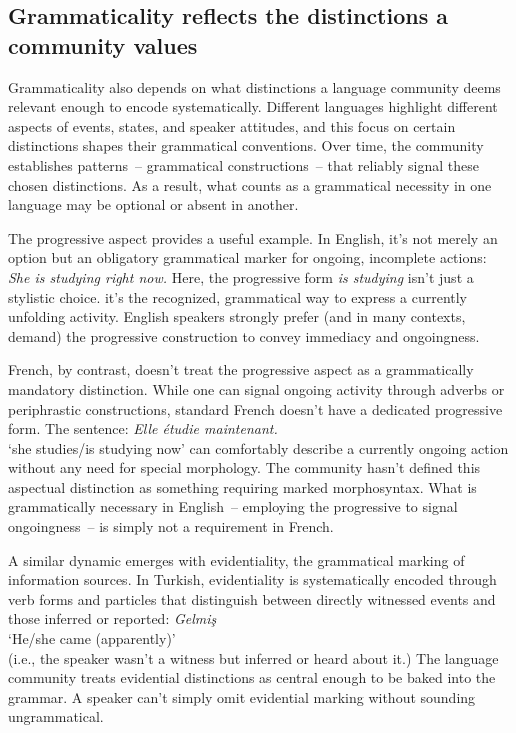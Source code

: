 \subsection{Grammaticality reflects the distinctions a community values}\label{sec:community-values}

Grammaticality also depends on what distinctions a language community deems relevant enough to encode systematically. Different languages highlight different aspects of events, states, and speaker attitudes, and this focus on certain distinctions shapes their grammatical conventions. Over time, the community establishes patterns~-- grammatical constructions~-- that reliably signal these chosen distinctions. As a result, what counts as a grammatical necessity in one language may be optional or absent in another.

The progressive aspect provides a useful example. In English, it's not merely an option but an obligatory grammatical marker for ongoing, incomplete actions:
\ea
\textit{She is studying right now.}
\z
Here, the progressive form \textit{is studying} isn't just a stylistic choice. it's the recognized, grammatical way to express a currently unfolding activity. English speakers strongly prefer (and in many contexts, demand) the progressive construction to convey immediacy and ongoingness.

French, by contrast, doesn't treat the progressive aspect as a grammatically mandatory distinction. While one can signal ongoing activity through adverbs or periphrastic constructions, standard French doesn't have a dedicated progressive form. The sentence:
\ea
\textit{Elle étudie maintenant.}\\
`she studies/is studying now'
\z
can comfortably describe a currently ongoing action without any need for special morphology. The community hasn't defined this aspectual distinction as something requiring marked morphosyntax. What is grammatically necessary in English~-- employing the progressive to signal ongoingness~-- is simply not a requirement in French.

A similar dynamic emerges with evidentiality, the grammatical marking of information sources. In Turkish, evidentiality is systematically encoded through verb forms and particles that distinguish between directly witnessed events and those inferred or reported:
\ea
\textit{Gelmiş}\\
`He/she came (apparently)' \\(i.e., the speaker wasn't a witness but inferred or heard about it.)
\z
The language community treats evidential distinctions as central enough to be baked into the grammar. A speaker can't simply omit evidential marking without sounding ungrammatical.

